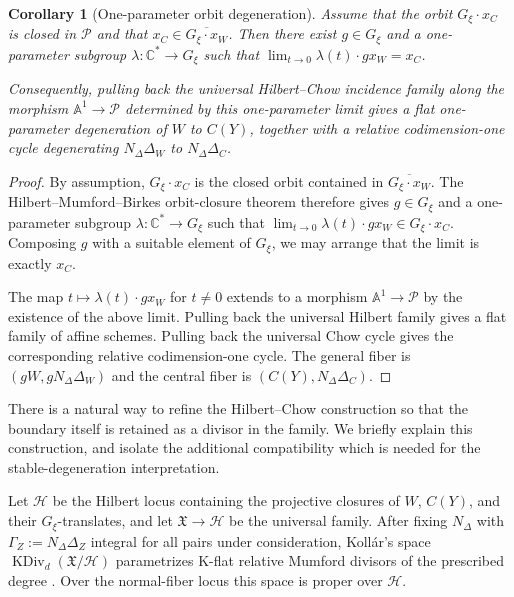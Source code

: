\documentclass[11pt]{amsart}
\newtheorem{corollary}[theorem]{Corollary}
\theoremstyle{definition}
\theoremstyle{remark}
\begin{document}
\begin{corollary}[One-parameter orbit degeneration]
Assume that the orbit $G_\xi\cdot x_C$ is closed in $\mathcal P$ and that
$x_C\in\overline{G_\xi\cdot x_W}$. Then there exist $g\in G_\xi$ and a
one-parameter subgroup $\lambda:\mathbb C^*\to G_\xi$ such that
$\lim_{t\to0}\lambda(t)\cdot g x_W=x_C$.

Consequently, pulling back the universal Hilbert--Chow incidence family along
the morphism $\mathbb A^1\to \mathcal{P}$ determined by this one-parameter limit
gives a flat one-parameter degeneration of $W$ to $C(Y)$, together with a
relative codimension-one cycle degenerating $N_\Delta\Delta_W$ to
$N_\Delta\Delta_C$.
\end{corollary}

\begin{proof}
By assumption, $G_\xi\cdot x_C$ is the closed orbit contained in
$\overline{G_\xi\cdot x_W}$. The Hilbert--Mumford--Birkes orbit-closure theorem
therefore gives $g\in G_\xi$ and a one-parameter subgroup
$\lambda:\mathbb C^*\to G_\xi$ such that
$\lim_{t\to0}\lambda(t)\cdot g x_W\in G_\xi\cdot x_C$. Composing $g$ with a
suitable element of $G_\xi$, we may arrange that the limit is exactly $x_C$.

The map $t\mapsto \lambda(t)\cdot g x_W$ for $t\neq0$ extends to a morphism
$\mathbb A^1\to \mathcal P$ by the existence of the above limit. Pulling back the
universal Hilbert family gives a flat family of affine schemes. Pulling back
the universal Chow cycle gives the corresponding relative codimension-one
cycle. The general fiber is $(gW,gN_\Delta\Delta_W)$ and the central fiber is
$(C(Y),N_\Delta\Delta_C)$.
\end{proof}

There is a natural way to refine the Hilbert--Chow construction so that the
boundary itself is retained as a divisor in the family. We briefly explain this
construction, and isolate the additional compatibility which is needed for the
stable-degeneration interpretation.

Let $\mathcal H$ be the Hilbert locus containing the projective closures of
$W$, $C(Y)$, and their $G_\xi$-translates, and let
$\mathfrak X\to\mathcal H$ be the universal family. After fixing
$N_\Delta$ with $\Gamma_Z:=N_\Delta\Delta_Z$ integral for all pairs under consideration, Koll\'ar's space $\operatorname{KDiv}_{d}(\mathfrak X/\mathcal H)$
parametrizes K-flat relative Mumford divisors of the prescribed degree
\cite{KollarFamiliesDivisors}. Over the normal-fiber locus this space is proper
over $\mathcal H$.
\end{document}
